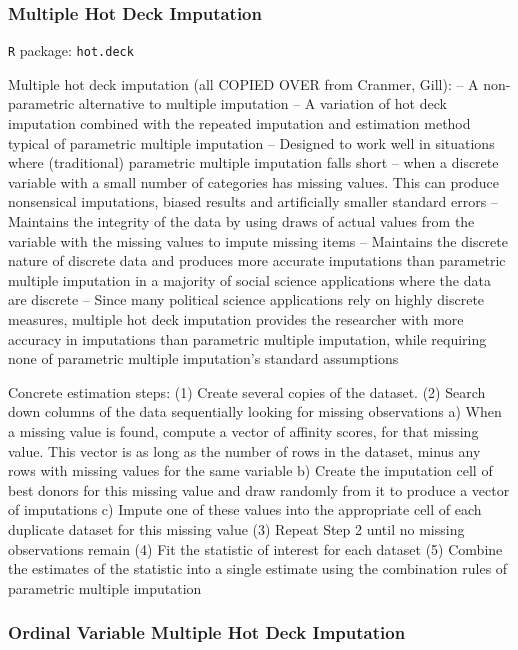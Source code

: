 \documentclass[12pt,econ]{sources/authesis}
\begin{document}
\hypertarget{ordmiss-theory-multimpute-hdnorm}{%
\subsubsection{Multiple Hot Deck Imputation}\label{ordmiss-theory-multimpute-hdnorm}}

\texttt{R} package: \texttt{hot.deck}

Multiple hot deck imputation (all COPIED OVER from Cranmer, Gill):
-- A non-parametric alternative to multiple imputation
-- A variation of hot deck imputation combined with the repeated imputation and estimation method typical of parametric multiple imputation
-- Designed to work well in situations where (traditional) parametric multiple imputation falls short -- when a discrete variable with a small number of categories has missing values. This can produce nonsensical imputations, biased results and artificially smaller standard errors
-- Maintains the integrity of the data by using draws of actual values from the variable with the missing values to impute missing items
-- Maintains the discrete nature of discrete data and produces more accurate imputations than parametric multiple imputation in a majority of social science applications where the data are discrete
-- Since many political science applications rely on highly discrete measures, multiple hot deck imputation provides the researcher with more accuracy in imputations than parametric multiple imputation, while requiring none of parametric multiple imputation's standard assumptions

Concrete estimation steps:
(1) Create several copies of the dataset.
(2) Search down columns of the data sequentially looking for missing observations
a) When a missing value is found, compute a vector of affinity scores, for that missing value. This vector is as long as the number of rows in the dataset, minus any rows with missing values for the same variable
b) Create the imputation cell of best donors for this missing value and draw randomly from it to produce a vector of imputations
c) Impute one of these values into the appropriate cell of each duplicate dataset for this missing value
(3) Repeat Step 2 until no missing observations remain
(4) Fit the statistic of interest for each dataset
(5) Combine the estimates of the statistic into a single estimate using the combination rules of parametric multiple imputation

\hypertarget{ordmiss-theory-multimpute-hdord}{%
\subsubsection{Ordinal Variable Multiple Hot Deck Imputation}\label{ordmiss-theory-multimpute-hdord}}
\end{document}
